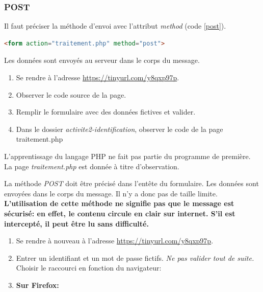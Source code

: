\documentclass[a4paper,11pt]{article}
\begin{document}
\begin{Form}
\subsubsection{POST}
Il faut préciser la méthode d'envoi avec l'attribut \emph{method} (code \ref{post}).
\begin{center}
\begin{lstlisting}[language=HTML]
<form action="traitement.php" method="post">
\end{lstlisting}
\label{post}
\end{center}
Les données sont envoyés au serveur dans le corps du message.
\begin{activite}
\begin{enumerate}
\item Se rendre à l'adresse \url{https://tinyurl.com/y8qxp97p}.
\item Observer le code source de la page.
\item Remplir le formulaire avec des données fictives et valider.
\item Dans le dossier \emph{activite2-identification}, observer le code de la page traitement.php
\end{enumerate}
\end{activite}
\begin{aretenir}[Remarque]
L'apprentissage du langage PHP ne fait pas partie du programme de première. La page \emph{traitement.php} est donnée à titre d'observation.
\end{aretenir}
\begin{aretenir}[]
La méthode \emph{POST} doit être précisé dans l'entête du formulaire. Les données sont envoyées dans le corps du message. Il n'y a donc pas de taille limite.\\
\textbf{L'utilisation de cette méthode ne signifie pas que le message est sécurisé: en effet, le contenu circule en clair sur internet. S'il est intercepté, il peut être lu sans difficulté.}
\end{aretenir}
\begin{activite}
\begin{enumerate}
\item Se rendre à nouveau à l'adresse \url{https://tinyurl.com/y8qxp97p}.
\item Entrer un identifiant et un mot de passe fictifs. \emph{Ne pas valider tout de suite.}
\\Choisir le raccourci en fonction du navigateur:
\item \textbf{Sur Firefox:}

\end{enumerate}
\end{activite}
\end{Form}
\end{document}
